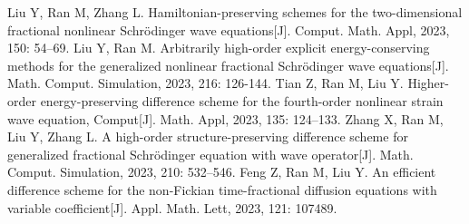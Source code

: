    \begin{mypaper}
      \begin{thebibliography}{99}  
       Liu Y, Ran M, Zhang L. Hamiltonian-preserving schemes for the two-dimensional fractional nonlinear Schrödinger wave equations[J]. Comput. Math. Appl, 2023, 150: 54–69.
       Liu Y, Ran M. Arbitrarily high-order explicit energy-conserving methods for the generalized nonlinear fractional Schrödinger wave equations[J]. Math. Comput. Simulation, 2023, 216: 126-144.
       Tian Z, Ran M, Liu Y. Higher-order energy-preserving difference scheme for the fourth-order nonlinear strain wave equation, Comput[J]. Math. Appl, 2023, 135: 124–133.
       Zhang X, Ran M, Liu Y, Zhang L. A high-order structure-preserving difference scheme for generalized fractional Schrödinger equation with wave operator[J]. Math. Comput. Simulation, 2023, 210: 532–546.
       Feng Z, Ran M, Liu Y. An efficient difference scheme for the non-Fickian time-fractional diffusion equations with variable coefficient[J]. Appl. Math. Lett, 2023, 121: 107489.
      \end{thebibliography}
   \end{mypaper}
   